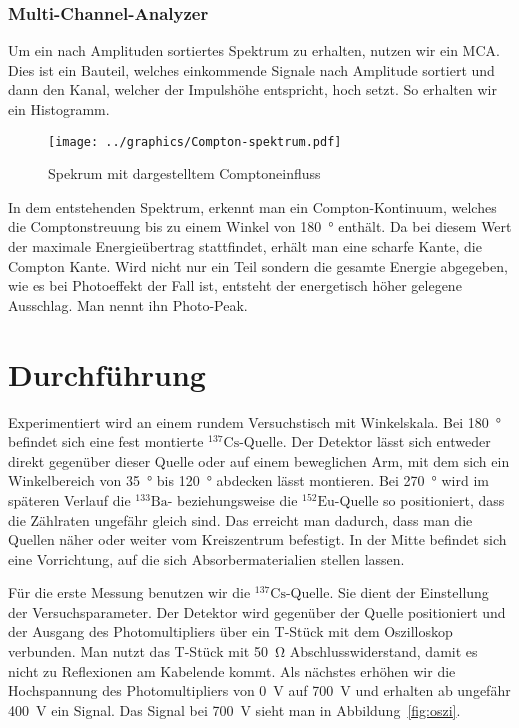 \documentclass[11pt, ngerman, fleqn, DIV=15, headinclude, BCOR=2cm]{scrreprt}
\begin{document}

\subsection{Multi-Channel-Analyzer}
Um ein nach Amplituden sortiertes Spektrum zu erhalten, nutzen wir ein MCA.
Dies ist ein Bauteil, welches einkommende Signale nach Amplitude sortiert und
dann den Kanal, welcher der Impulshöhe entspricht, hoch setzt. So erhalten wir ein
Histogramm.

\begin{figure}
	\centering
	\texttt{[image: ../graphics/Compton-spektrum.pdf]}
	\caption{%
		Spekrum mit dargestelltem Comptoneinfluss \parencite{comptoneffekt}
	}
\end{figure}

In dem entstehenden Spektrum, erkennt man ein Compton-Kontinuum, welches die 
Comptonstreuung bis zu einem Winkel von \SI{180}{\degree} enthält. Da bei diesem
Wert der maximale Energieübertrag stattfindet, erhält man eine scharfe Kante, 
die Compton Kante. Wird nicht nur ein Teil sondern die gesamte Energie abgegeben, wie es bei 
Photoeffekt der Fall ist, entsteht der energetisch höher gelegene Ausschlag. Man 
nennt ihn Photo-Peak.


\chapter{Durchführung}
Experimentiert wird an einem rundem Versuchstisch mit Winkelskala.
Bei \SI{180}{\degree} befindet sich eine fest montierte
$^{137}\text{Cs}$-Quelle. Der Detektor lässt sich entweder direkt gegenüber
dieser Quelle oder auf einem beweglichen Arm, mit dem sich ein Winkelbereich
von \SI{35}{\degree} bis \SI{120}{\degree} abdecken lässt montieren. Bei
\SI{270}{\degree} wird im späteren Verlauf die $^{133}\text{Ba}$- beziehungsweise die
$^{152}\text{Eu}$-Quelle so positioniert, dass die Zählraten ungefähr gleich
sind. Das erreicht man dadurch, dass man die Quellen näher oder weiter vom
Kreiszentrum befestigt. 
In der Mitte befindet sich eine Vorrichtung, auf die sich Absorbermaterialien stellen lassen.

Für die erste Messung benutzen wir die $^{137}\text{Cs}$-Quelle. Sie dient der
Einstellung der Versuchsparameter. Der Detektor wird gegenüber der Quelle
positioniert und der Ausgang des Photomultipliers über ein T-Stück mit dem
Oszilloskop verbunden. Man nutzt das T-Stück mit \SI{50}{\ohm}
Abschlusswiderstand, damit es nicht zu Reflexionen
am Kabelende kommt. Als nächstes erhöhen wir die Hochspannung des
Photomultipliers von \SI{0}{\volt} auf \SI{700}{\volt} und erhalten ab ungefähr
\SI{400}{\volt} ein Signal. Das Signal bei \SI{700}{\volt} sieht man in
Abbildung~\ref{fig:oszi}.
\end{document}
